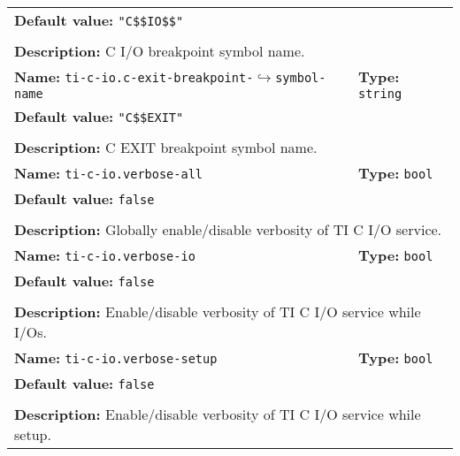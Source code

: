 \begin{center}
\begin{tabular}{|p{7.5cm}|p{7.5cm}|}
	\multicolumn{2}{|p{15cm}|}{\textbf{Default value:} \texttt{"C\$\$IO\$\$"}}\\
	\multicolumn{2}{|l|}{}\\
	\multicolumn{2}{|p{15cm}|}{\textbf{Description:} \newline C I/O breakpoint symbol name.}\\
	\hline
	\multicolumn{1}{|p{7.5cm}}{\textbf{Name:} \texttt{ti-c-io.c-exit-breakpoint-}\newline$\hookrightarrow$\texttt{symbol-name}} & \multicolumn{1}{p{7.5cm}|}{\textbf{Type:} \texttt{string}}\\
	\multicolumn{2}{|p{15cm}|}{\textbf{Default value:} \texttt{"C\$\$EXIT"}}\\
	\multicolumn{2}{|l|}{}\\
	\multicolumn{2}{|p{15cm}|}{\textbf{Description:} \newline C EXIT breakpoint symbol name.}\\
	\hline
	\multicolumn{1}{|p{7.5cm}}{\textbf{Name:} \texttt{ti-c-io.verbose-all}} & \multicolumn{1}{p{7.5cm}|}{\textbf{Type:} \texttt{bool}}\\
	\multicolumn{2}{|p{15cm}|}{\textbf{Default value:} \texttt{false}}\\
	\multicolumn{2}{|l|}{}\\
	\multicolumn{2}{|p{15cm}|}{\textbf{Description:} \newline Globally enable/disable verbosity of TI C I/O service.}\\
	\hline
	\multicolumn{1}{|p{7.5cm}}{\textbf{Name:} \texttt{ti-c-io.verbose-io}} & \multicolumn{1}{p{7.5cm}|}{\textbf{Type:} \texttt{bool}}\\
	\multicolumn{2}{|p{15cm}|}{\textbf{Default value:} \texttt{false}}\\
	\multicolumn{2}{|l|}{}\\
	\multicolumn{2}{|p{15cm}|}{\textbf{Description:} \newline Enable/disable verbosity of TI C I/O service while I/Os.}\\
	\hline
	\multicolumn{1}{|p{7.5cm}}{\textbf{Name:} \texttt{ti-c-io.verbose-setup}} & \multicolumn{1}{p{7.5cm}|}{\textbf{Type:} \texttt{bool}}\\
	\multicolumn{2}{|p{15cm}|}{\textbf{Default value:} \texttt{false}}\\
	\multicolumn{2}{|l|}{}\\
	\multicolumn{2}{|p{15cm}|}{\textbf{Description:} \newline Enable/disable verbosity of TI C I/O service while setup.}\\
	\hline
	\end{tabular}
\end{center}

